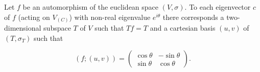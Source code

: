 Let $f$ be an automorphism of the euclidean space $(V, \sigma)$. To each eigenvector $c$ of $f$ (acting on $V_{(C)}$) with non-real eigenvalue $e^{i\theta}$ there corresponds a two-dimensional subspace $T$ of $V$ such that $T f = T$ and a cartesian basis $(u, v)$ of $(T, \sigma_T)$ such that

$$(f; (u, v)) = \begin{pmatrix} \cos \theta & -\sin \theta \\ \sin \theta & \cos \theta \end{pmatrix}.$$
